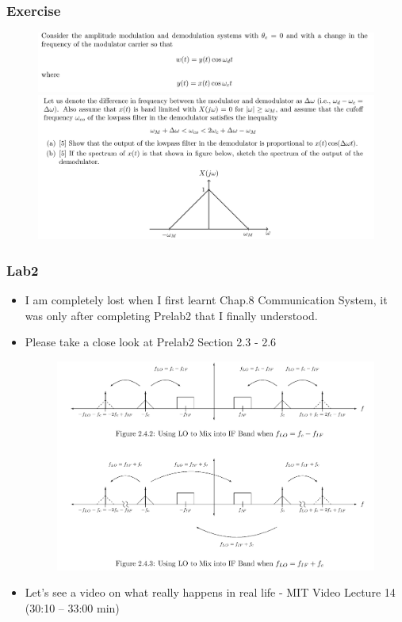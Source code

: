 \documentclass{beamer}
\begin{document}
\begin{frame}[t]
    \frametitle{Exercise}
    \begin{figure}
        \includegraphics[width=0.8\linewidth]{q8a}
        \includegraphics[width=0.8\linewidth]{q8b}
    \end{figure}

\end{frame}

\begin{frame}
    \frametitle{Lab2}
    \begin{itemize}
        \item I am completely lost when I first learnt Chap.8 Communication System, it was only after completing Prelab2 that I finally understood.
        \item Please take a close look at Prelab2 Section 2.3 - 2.6  
        \begin{figure}
            \includegraphics[width=0.6\linewidth]{prelab2.PNG}
        \end{figure}  
        \item Let's see a video on what really happens in real life - MIT Video Lecture 14 (30:10 – 33:00 min)
           
    \end{itemize}
    
\end{frame}
\end{document}
